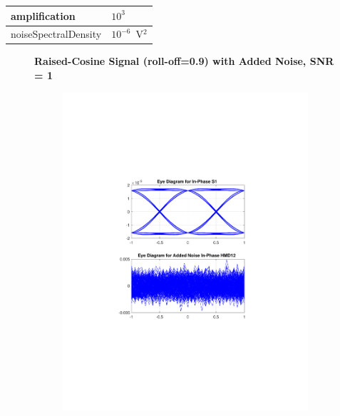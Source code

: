 \begin{refsection}
\begin{table}[H]
\begin{tabular}{|l|l|}
		amplification          & $10^3$                                                     \\ \hline
		noiseSpectralDensity   & $10^{-6}$~V$^2$                             					\\ \hline
	\end{tabular}
\end{table}
\begin{figure}[H]
		\centering
	\textbf{Raised-Cosine Signal (roll-off=0.9) with Added Noise, SNR = 1}
	\begin{minipage}{\linewidth}
		\centering
	\begin{subfigure}{.45\textwidth}
		\centering
		\includegraphics[clip, trim=5cm 7cm 5cm 7cm, width=\textwidth]{./sdf/m_qam_system/figures/eyes/if_n_nmf_60_60_rc_09.pdf}

\end{subfigure}
\end{minipage}
\end{figure}
\end{refsection}
